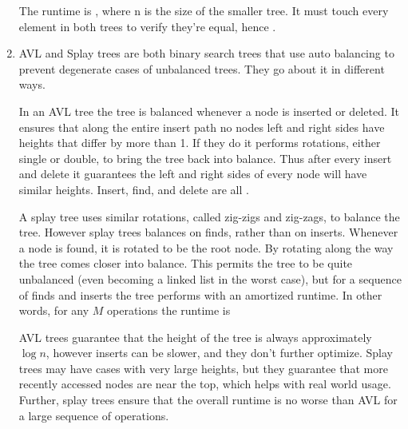 \documentclass[12pt]{chmullighw}
\begin{document}
\begin{enumerate}
The runtime is , where n is the size of the smaller tree. It must touch
every element in both trees to verify they're equal, hence .

\item AVL and Splay trees are both binary search trees that use auto balancing to
prevent degenerate cases of unbalanced trees. They go about it in different ways.

In an AVL tree the tree is balanced whenever a node is inserted or deleted. It
ensures that along the entire insert path no nodes left and right sides have
heights that differ by more than 1. If they do it performs rotations, either single
or double, to bring the tree back into balance. Thus after every insert and delete
it guarantees the left and right sides of every node will have similar heights.
Insert, find, and delete are all . 

A splay tree uses similar rotations, called zig-zigs and zig-zags, to balance the
tree. However splay trees balances on finds, rather than on inserts. Whenever a
node is found, it is rotated to be the root node. By rotating along the way the
tree comes closer into balance. This permits the tree to be quite unbalanced
(even becoming a linked list in the worst case), but for a sequence of finds
and inserts the tree performs with an amortized  runtime. In other
words, for any $M$ operations the runtime is 

AVL trees guarantee that the height of the tree is always approximately $\log n$,
however inserts can be slower, and they don't further optimize. Splay trees may
have cases with very large heights, but they guarantee that more recently accessed
nodes are near the top, which helps with real world usage. Further, splay trees
ensure that the overall runtime is no worse than AVL for a large sequence of
operations.

\end{enumerate} %
\end{document}
